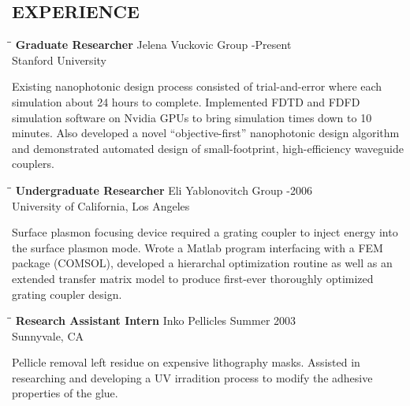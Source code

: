 \documentclass{res}
\begin{document}
\begin{resume}
\section{EXPERIENCE}
   \vspace{-0.1in}	
   \begin{tabbing}
   \hspace{2.3in}\= \hspace{2.6in}\= \kill %
    {\bf Graduate Researcher} \>Jelena Vuckovic Group -Present\\
                             \>Stanford University
   \end{tabbing}\vspace{-20pt}      %
    Existing nanophotonic design process consisted of trial-and-error
        where each simulation about 24 hours to complete.
    Implemented FDTD and FDFD simulation software on Nvidia GPUs to bring 
        simulation times down to 10 minutes.
    Also developed a novel ``objective-first'' nanophotonic design algorithm
        and demonstrated automated design of 
        small-footprint, high-efficiency waveguide couplers.
   \begin{tabbing}
   \hspace{2.3in}\= \hspace{2.6in}\= \kill %
    {\bf Undergraduate Researcher} \>Eli Yablonovitch Group -2006\\
                          \>University of California, Los Angeles
   \end{tabbing}\vspace{-20pt}
    Surface plasmon focusing device required a grating coupler to inject energy
        into the surface plasmon mode.
    Wrote a Matlab program interfacing with a FEM package (COMSOL),
        developed a hierarchal optimization routine as well as an extended 
        transfer matrix model to produce first-ever thoroughly optimized 
        grating coupler design.
   \begin{tabbing}%
   \hspace{2.3in}\= \hspace{2.6in}\= \kill %
   {\bf Research Assistant Intern}  \>Inko Pellicles \> Summer 2003\\
                          \>Sunnyvale, CA
   \end{tabbing}\vspace{-20pt}
    Pellicle removal left residue on expensive lithography masks.
    Assisted in researching and developing a UV irradition process
        to modify the adhesive properties of the glue.



\end{resume}
\end{document}

